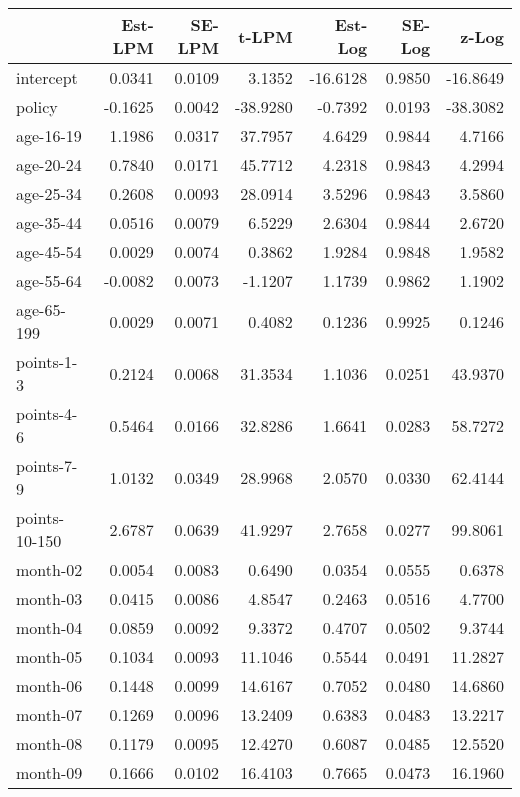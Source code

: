 \documentclass[10pt]{article}
\begin{document}
\begin{table}[ht]
\centering
\begin{tabular}{lrrrrrr}
  \hline
 & Est-LPM & SE-LPM & t-LPM & Est-Log & SE-Log & z-Log \\ 
  \hline
intercept & 0.0341 & 0.0109 & 3.1352 & -16.6128 & 0.9850 & -16.8649 \\ 
  policy & -0.1625 & 0.0042 & -38.9280 & -0.7392 & 0.0193 & -38.3082 \\ 
  age-16-19 & 1.1986 & 0.0317 & 37.7957 & 4.6429 & 0.9844 & 4.7166 \\ 
  age-20-24 & 0.7840 & 0.0171 & 45.7712 & 4.2318 & 0.9843 & 4.2994 \\ 
  age-25-34 & 0.2608 & 0.0093 & 28.0914 & 3.5296 & 0.9843 & 3.5860 \\ 
  age-35-44 & 0.0516 & 0.0079 & 6.5229 & 2.6304 & 0.9844 & 2.6720 \\ 
  age-45-54 & 0.0029 & 0.0074 & 0.3862 & 1.9284 & 0.9848 & 1.9582 \\ 
  age-55-64 & -0.0082 & 0.0073 & -1.1207 & 1.1739 & 0.9862 & 1.1902 \\ 
  age-65-199 & 0.0029 & 0.0071 & 0.4082 & 0.1236 & 0.9925 & 0.1246 \\ 
  points-1-3 & 0.2124 & 0.0068 & 31.3534 & 1.1036 & 0.0251 & 43.9370 \\ 
  points-4-6 & 0.5464 & 0.0166 & 32.8286 & 1.6641 & 0.0283 & 58.7272 \\ 
  points-7-9 & 1.0132 & 0.0349 & 28.9968 & 2.0570 & 0.0330 & 62.4144 \\ 
  points-10-150 & 2.6787 & 0.0639 & 41.9297 & 2.7658 & 0.0277 & 99.8061 \\ 
  month-02 & 0.0054 & 0.0083 & 0.6490 & 0.0354 & 0.0555 & 0.6378 \\ 
  month-03 & 0.0415 & 0.0086 & 4.8547 & 0.2463 & 0.0516 & 4.7700 \\ 
  month-04 & 0.0859 & 0.0092 & 9.3372 & 0.4707 & 0.0502 & 9.3744 \\ 
  month-05 & 0.1034 & 0.0093 & 11.1046 & 0.5544 & 0.0491 & 11.2827 \\ 
  month-06 & 0.1448 & 0.0099 & 14.6167 & 0.7052 & 0.0480 & 14.6860 \\ 
  month-07 & 0.1269 & 0.0096 & 13.2409 & 0.6383 & 0.0483 & 13.2217 \\ 
  month-08 & 0.1179 & 0.0095 & 12.4270 & 0.6087 & 0.0485 & 12.5520 \\ 
  month-09 & 0.1666 & 0.0102 & 16.4103 & 0.7665 & 0.0473 & 16.1960 \\ 

\end{tabular}
\end{table}
\end{document}
